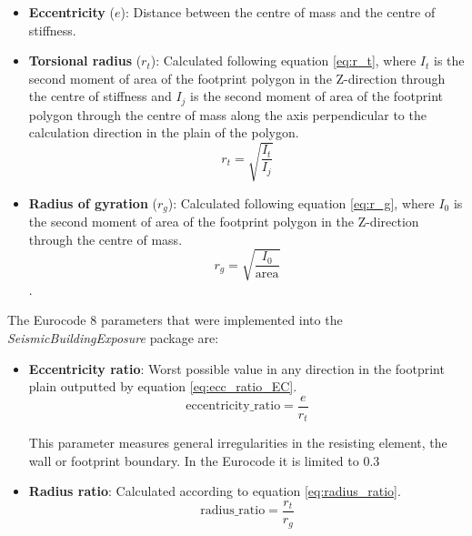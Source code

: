 \begin{refsection}
\begin{itemize}
\item \textbf{Eccentricity} ($e$): Distance between the centre of mass and the centre of stiffness. 

\item \textbf{Torsional radius} ($r_t$): Calculated following equation \ref{eq:r_t}, where $I_t$ is the second moment of area of the footprint polygon in the Z-direction through the centre of stiffness and $I_j$ is the second moment of area of the footprint polygon through the centre of mass along the axis perpendicular to the calculation direction in the plain of the polygon.
\begin{equation}
    \label{eq:r_t}
    r_t = \sqrt{\frac{I_t}{I_j}}
\end{equation}

\item \textbf{Radius of gyration} ($r_g$): Calculated following equation \ref{eq:r_g}, where $I_0$ is the second moment of area of the footprint polygon in the Z-direction through the centre of mass.
\begin{equation}
    \label{eq:r_g}
    r_g = \sqrt{\frac{I_0}{\text{area}}}
\end{equation}.

\end{itemize}

The Eurocode 8 parameters that were implemented into the \textit{SeismicBuildingExposure} package are: 

\begin{itemize}
    \item \textbf{Eccentricity ratio}: Worst possible value in any direction in the footprint plain outputted by equation \ref{eq:ecc_ratio_EC}.
    \begin{equation}
        \label{eq:ecc_ratio_EC}
        \text{eccentricity\_ratio} = \frac{e}{r_t}
    \end{equation}


    This parameter measures general irregularities in the resisting element, the wall or footprint boundary. In the Eurocode it is limited to $0.3$ %
    
    \item \textbf{Radius ratio}: Calculated according to equation \ref{eq:radius_ratio}. 
    \begin{equation}
        \label{eq:radius_ratio}
        \text{radius\_ratio} = \frac{r_t}{r_g}
    \end{equation}


\end{itemize}
\end{refsection}
